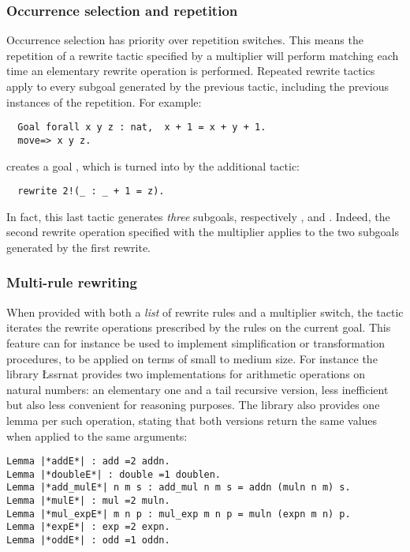 \subsubsection*{Occurrence selection and repetition}
Occurrence selection has priority over repetition switches. This means
the repetition of a rewrite tactic specified by a multiplier
will perform matching each time an elementary rewrite operation is
performed. Repeated rewrite tactics apply to every subgoal generated
by the previous tactic, including the previous instances of the
repetition. For example:
\begin{lstlisting}
  Goal forall x y z : nat,  x + 1 = x + y + 1.
  move=> x y z.
\end{lstlisting}
creates a goal , which is turned into 
by the additional tactic:
\begin{lstlisting}
  rewrite 2!(_ : _ + 1 = z).
\end{lstlisting}
In fact, this last tactic generates \emph{three} subgoals,
respectively
,  and . Indeed, the second
rewrite operation specified with the  multiplier applies to
the two subgoals generated by the first rewrite.

\subsubsection*{Multi-rule rewriting}
When provided with both a \emph{list} of rewrite rules and a
multiplier switch, the  tactic iterates the rewrite
operations prescribed by the rules on the current goal. This feature
can for instance be used to implement simplification or transformation
procedures, to be applied on terms of small to medium size. For
instance the library \L{ssrnat} provides two implementations for
arithmetic operations on natural numbers: an elementary one and a tail
recursive version, less inefficient but also less convenient for
reasoning purposes. The library also provides one lemma per such
operation, stating that both versions return the same values when
applied to the same arguments:

\begin{lstlisting}
Lemma |*addE*| : add =2 addn.
Lemma |*doubleE*| : double =1 doublen.
Lemma |*add_mulE*| n m s : add_mul n m s = addn (muln n m) s.
Lemma |*mulE*| : mul =2 muln.
Lemma |*mul_expE*| m n p : mul_exp m n p = muln (expn m n) p.
Lemma |*expE*| : exp =2 expn.
Lemma |*oddE*| : odd =1 oddn.
\end{lstlisting}

